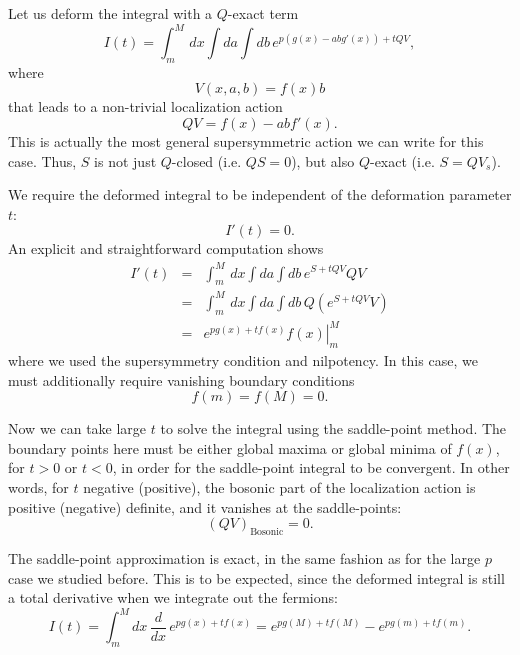 Let us deform the integral with a $Q$-exact term
\begin{equation}
 I(t)=\int_m^M \, dx \int da \int db \, e^{p(g(x)-a b g'(x))+ t Q V},
\end{equation}
where 
\begin{equation}
 V(x, a, b) = f(x) b
\end{equation}
that leads to a non-trivial localization action
\begin{equation}
 QV = f(x)-a b f'(x).
\end{equation}
This is actually the most general supersymmetric action we can write for this case.
Thus, $S$ is not just $Q$-closed (i.e. $QS=0$), but also $Q$-exact (i.e. $S=QV_s$).


We require the deformed integral to be independent of the deformation parameter $t$:
\begin{equation}
 I'(t)=0.
\end{equation}
An explicit and straightforward computation shows
\begin{eqnarray}
 I'(t) &=& \int_m^M \, dx \int da \int db \, e^{S + t Q V} Q V \\
       &=& \int_m^M \, dx \int da \int db \, Q (e^{S + t Q V} V)\\
       &=& \left. e^{p g(x)+ t f(x)} f(x) \right|^M_m
\end{eqnarray}
where we used the supersymmetry condition and nilpotency. 
In this case, we must additionally require vanishing boundary conditions
\begin{equation}
 f(m)=f(M)=0.
\end{equation}

Now we can take large $t$ to solve the integral using the saddle-point method.
The boundary points here must be either global maxima or global minima of $f(x)$,
for $t>0$ or $t<0$, in order for the saddle-point integral to be convergent.
In other words, for $t$ negative (positive), 
the bosonic part of the localization action is positive (negative) definite, 
and it vanishes at the saddle-points:
\begin{equation}
 (QV)_\text{Bosonic}=0.
\end{equation}

The saddle-point approximation is exact, in the same fashion as for the large $p$ case we studied before.
This is to be expected, 
since the deformed integral is still a total derivative when we integrate out the fermions:
\begin{equation}
 I(t) = \int_m^M  dx \, \dfrac{d}{d x}\,e^{p g(x) + t f(x)} 
      = e^{p g(M)+ t f(M)}-e^{p g(m)+ t f(m)}.
\end{equation}

